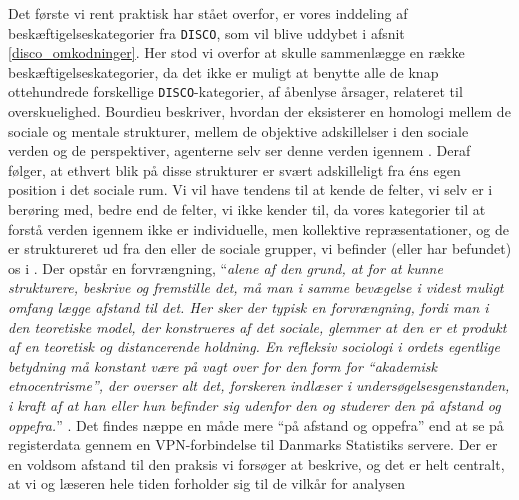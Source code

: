 Det første vi rent praktisk har stået overfor, er vores inddeling af beskæftigelseskategorier fra \texttt{DISCO}, som vil blive uddybet i afsnit \ref{disco_omkodninger}. Her stod vi overfor at skulle sammenlægge en række beskæftigelseskategorier, da det ikke er muligt at benytte alle de knap ottehundrede forskellige \texttt{DISCO}-kategorier, af åbenlyse årsager, relateret til overskuelighed. Bourdieu beskriver, hvordan der eksisterer en homologi mellem de sociale og mentale strukturer, mellem de objektive adskillelser i den sociale verden og de perspektiver, agenterne selv ser denne verden igennem \parencite[12]{Bourdieu1992}. Deraf følger, at ethvert blik på disse strukturer er svært adskilleligt fra éns egen position i det sociale rum. Vi vil have tendens til at kende de felter, vi selv er i berøring med, bedre end de felter, vi ikke kender til, da vores kategorier til at forstå verden igennem ikke er individuelle, men kollektive repræsentationer, og de er struktureret ud fra den eller de sociale grupper, vi befinder (eller har befundet) os i \parencite[12]{Bourdieu1992}. Der opstår en forvrængning, “\emph{alene af den grund, at for at kunne strukturere, beskrive og fremstille det, må man i samme bevægelse i videst muligt omfang lægge afstand til det. Her sker der typisk en forvrængning, fordi man i den teoretiske model, der konstrueres af det sociale, glemmer at den er et produkt af en teoretisk og distancerende holdning. En refleksiv sociologi i ordets egentlige betydning må konstant være på vagt over for den form for “akademisk etnocentrisme”, der overser alt det, forskeren indlæser i undersøgelsesgenstanden, i kraft af at han eller hun befinder sig udenfor den og studerer den på afstand og oppefra.}” \parencite[62]{Bourdieu1996}. Det findes næppe en måde mere “på afstand og oppefra” end at se på registerdata gennem en VPN-forbindelse til Danmarks Statistiks servere. Der er en voldsom afstand til den praksis vi forsøger at beskrive, og det er helt centralt, at vi og læseren hele tiden forholder sig til de vilkår for analysen%
%
